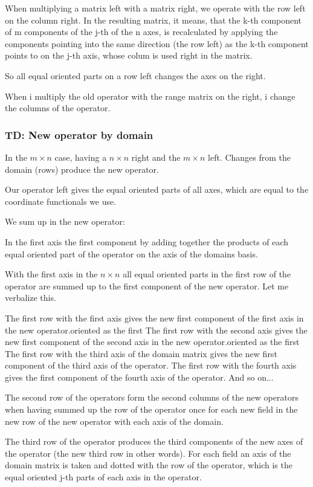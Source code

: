 \documentclass[a4paper]{article}
\begin{document}
When multiplying a matrix left with a matrix
 right, we operate with the row left on the column right. In the resulting matrix, it means, that the k-th component of m components of the j-th of the n axes, is recalculated by applying the components pointing into the same direction (the row left) as the k-th component points to on the j-th axis, whose colum is used right in the matrix.

So all equal oriented parts on a row left changes the axes on the right.

When i multiply the old operator with the range matrix on the right, i change the columns of the operator. 

\subsubsection{TD: New operator by domain}

In the $m \times n$ case, having a $n \times n$ right and the $m \times n$ left. Changes from the domain (rows) produce the new operator.

Our operator left gives the equal oriented parts of all axes, which are equal to the coordinate functionals we use.

We sum up in the new operator:

In the first axis the first component by adding together the products of each equal oriented part of the operator on the axis of the domains basis. 

With the first axis in the $n \times n$ all equal oriented parts in the first row of the operator are summed up to the first component of the new operator. Let me verbalize this.

The first row with the first axis gives the new first component of the first axis in the new operator.oriented as the first 
The first row with the second axis gives the new first component of the second axis in the new operator.oriented as the first 
The first row with the third axis of the domain matrix gives the new first component of the third axis of the operator.
The first row with the fourth axis gives the first component of the fourth axis of the operator. And so on...

The second row of the operators form the second columns of the new operators when having summed up the row of the operator once for each new field in the new row of the new operator with each axis of the domain.

The third row of the operator produces the third components of the new axes of the operator (the new third row in other words).
For each field an axis of the domain matrix is taken and dotted with the row of the operator, which is the equal oriented j-th parts of each axis in the operator.
\end{document}
